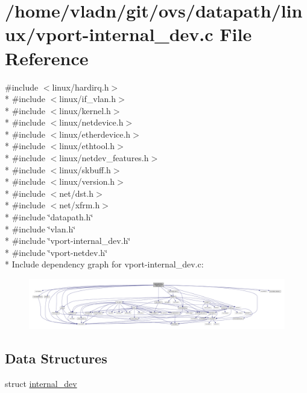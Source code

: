 \hypertarget{linux_2vport-internal__dev_8c}{}\section{/home/vladn/git/ovs/datapath/linux/vport-\/internal\+\_\+dev.c File Reference}
\label{linux_2vport-internal__dev_8c}
{\ttfamily \#include $<$linux/hardirq.\+h$>$}\\*
{\ttfamily \#include $<$linux/if\+\_\+vlan.\+h$>$}\\*
{\ttfamily \#include $<$linux/kernel.\+h$>$}\\*
{\ttfamily \#include $<$linux/netdevice.\+h$>$}\\*
{\ttfamily \#include $<$linux/etherdevice.\+h$>$}\\*
{\ttfamily \#include $<$linux/ethtool.\+h$>$}\\*
{\ttfamily \#include $<$linux/netdev\+\_\+features.\+h$>$}\\*
{\ttfamily \#include $<$linux/skbuff.\+h$>$}\\*
{\ttfamily \#include $<$linux/version.\+h$>$}\\*
{\ttfamily \#include $<$net/dst.\+h$>$}\\*
{\ttfamily \#include $<$net/xfrm.\+h$>$}\\*
{\ttfamily \#include \char`\"{}datapath.\+h\char`\"{}}\\*
{\ttfamily \#include \char`\"{}vlan.\+h\char`\"{}}\\*
{\ttfamily \#include \char`\"{}vport-\/internal\+\_\+dev.\+h\char`\"{}}\\*
{\ttfamily \#include \char`\"{}vport-\/netdev.\+h\char`\"{}}\\*
Include dependency graph for vport-\/internal\+\_\+dev.c\+:
\nopagebreak
\begin{figure}[H]
\begin{center}
\leavevmode
\includegraphics[width=350pt]{linux_2vport-internal__dev_8c__incl}
\end{center}
\end{figure}
\subsection*{Data Structures}
\begin{DoxyCompactItemize}
\item 
struct \hyperlink{structinternal__dev}{internal\+\_\+dev}
\end{DoxyCompactItemize}
